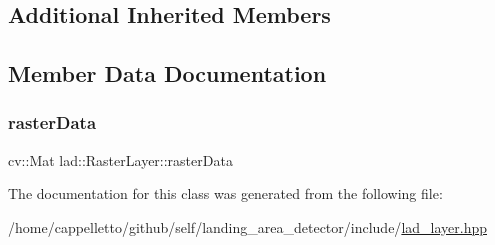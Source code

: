 \subsection*{Additional Inherited Members}


\subsection{Member Data Documentation}
\mbox{\label{classlad_1_1_raster_layer_a535fc341b4589834ed018b3e24c329b3}} 
\subsubsection{\texorpdfstring{raster\+Data}{rasterData}}
{\footnotesize\ttfamily cv\+::\+Mat lad\+::\+Raster\+Layer\+::raster\+Data}



The documentation for this class was generated from the following file\+:\begin{DoxyCompactItemize}
\item 
/home/cappelletto/github/self/landing\+\_\+area\+\_\+detector/include/\hyperlink{lad__layer_8hpp}{lad\+\_\+layer.\+hpp}\end{DoxyCompactItemize}
